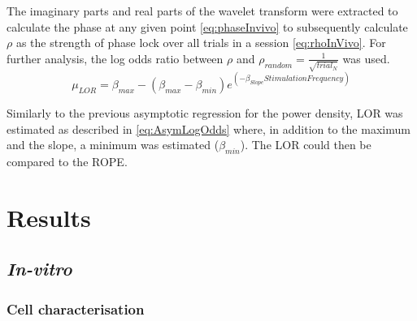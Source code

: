 \documentclass[
  12pt,
  a4paper,
  openany]{book}
\begin{document}
\noindent
The imaginary parts and real parts of the wavelet transform were extracted to calculate the phase at any given point \eqref{eq:phaseInvivo} to subsequently calculate \(\rho\) as the strength of phase lock over all trials in a session \eqref{eq:rhoInVivo}. For further analysis, the log odds ratio between \(\rho\) and \(\rho_{random}=\frac{1}{\sqrt{trial_{N}}}\) was used. \begin{equation}
\mu_{LOR} = \beta_{max}-({\beta_{max}-\beta_{min}}) e^{(-\beta_{Slope} StimulationFrequency)}
\label{eq:AsymLogOdds}
\end{equation}

\noindent
Similarly to the previous asymptotic regression for the power density, LOR was estimated as described in \eqref{eq:AsymLogOdds} where, in addition to the maximum and the slope, a minimum was estimated (\(\beta_{min}\)). The LOR could then be compared to the ROPE.

\hypertarget{results}{%
\chapter{Results}\label{results}}

\hypertarget{in-vitro}{%
\section{\texorpdfstring{\emph{In-vitro}}{In-vitro}}\label{in-vitro}}

\hypertarget{cell-characterisation-1}{%
\subsection{Cell characterisation}\label{cell-characterisation-1}}
\end{document}
